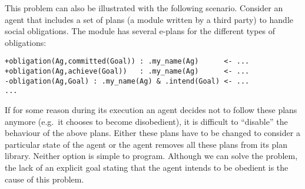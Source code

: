 This problem can also be illustrated with the following
scenario. Consider an agent that includes a set of plans (a module
written by a third party) to handle social obligations. The module has
several e-plans for the different types of obligations:
\begin{small}
\begin{verbatim}
+obligation(Ag,committed(Goal)) : .my_name(Ag)      <- ...
+obligation(Ag,achieve(Goal))   : .my_name(Ag)      <- ...
-obligation(Ag,Goal) : .my_name(Ag) & .intend(Goal) <- ...
...
\end{verbatim}
\end{small}
If for some reason during its execution an agent decides not to follow
these plans anymore (e.g.\ it chooses to become disobedient), it is
difficult to ``disable'' the behaviour of the above plans. Either
these plans have to be changed to consider a particular state of the
agent or the agent removes all these plans from its plan
library. Neither option is simple to
program. %
Although we can solve the problem, the lack of an explicit goal
stating that the agent intends to be obedient is the cause of this
problem.

%
%


